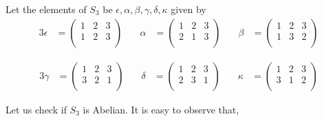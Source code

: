 Let the elements of $S_3$ be $\epsilon,\alpha,\beta,\gamma,\delta,\kappa$ given by
\begin{alignat*}{3}
\epsilon &=
 \begin{pmatrix}
  1 & 2 & 3 \\
  1 & 2 & 3 \\
 \end{pmatrix}
 & \quad \alpha &=  
 \begin{pmatrix}
  1 & 2 & 3 \\
  2 & 1 & 3 \\
 \end{pmatrix}
 & \quad \beta &=  
 \begin{pmatrix}
  1 & 2 & 3 \\
  1 & 3 & 2 \\
 \end{pmatrix}
\end{alignat*}

\begin{alignat*}{3}
\gamma &=
 \begin{pmatrix}
  1 & 2 & 3 \\
  3 & 2 & 1 \\
 \end{pmatrix}
 & \quad \delta &=  
 \begin{pmatrix}
  1 & 2 & 3 \\
  2 & 3 & 1 \\
 \end{pmatrix}
 & \quad \kappa &=  
 \begin{pmatrix}
  1 & 2 & 3 \\
  3 & 1 & 2 \\
 \end{pmatrix}
\end{alignat*}

Let us check if $S_3$ is Abelian. It is easy to observe that,

